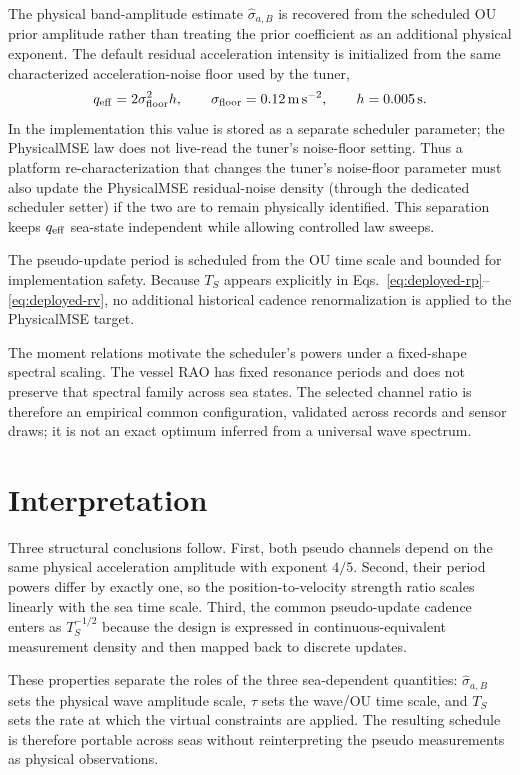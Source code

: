 \documentclass[conference]{IEEEtran}
\begin{document}
The physical band-amplitude estimate $\widehat\sigma_{a,B}$ is recovered from
the scheduled OU prior amplitude rather than treating the prior coefficient as
an additional physical exponent. The default residual acceleration intensity is
initialized from the same characterized acceleration-noise floor used by the
tuner,
\begin{equation}
 q_{\rm eff}=2\sigma_{\rm floor}^2h,
 \qquad
 \sigma_{\rm floor}=\SI{0.12}{m.s^{-2}},
 \qquad
 h=\SI{0.005}{s}.
 \label{eq:deployed-qeff}
\end{equation}
In the implementation this value is stored as a separate scheduler parameter;
the PhysicalMSE law does not live-read the tuner's noise-floor setting.  Thus a
platform re-characterization that changes the tuner's noise-floor parameter
must also update the PhysicalMSE residual-noise density (through the dedicated
scheduler setter) if the two are to remain physically identified.  This
separation keeps $q_{\rm eff}$ sea-state independent while allowing controlled
law sweeps.

The pseudo-update period is scheduled from the OU time scale and bounded for
implementation safety. Because $T_S$ appears explicitly in
Eqs.~\eqref{eq:deployed-rp}--\eqref{eq:deployed-rv}, no additional historical
cadence renormalization is applied to the PhysicalMSE target.

The moment relations motivate the scheduler's powers under a fixed-shape
spectral scaling. The vessel RAO has fixed resonance periods and does not
preserve that spectral family across sea states. The selected channel ratio
is therefore an empirical common configuration, validated across records and
sensor draws; it is not an exact optimum inferred from a universal wave spectrum.

\section{Interpretation}

Three structural conclusions follow. First, both pseudo channels depend on the
same physical acceleration amplitude with exponent $4/5$. Second, their period
powers differ by exactly one, so the position-to-velocity strength ratio scales
linearly with the sea time scale. Third, the common pseudo-update cadence enters
as $T_S^{-1/2}$ because the design is expressed in continuous-equivalent
measurement density and then mapped back to discrete updates.

These properties separate the roles of the three sea-dependent quantities:
$\widehat\sigma_{a,B}$ sets the physical wave amplitude scale, $\tau$ sets the
wave/OU time scale, and $T_S$ sets the rate at which the virtual constraints are
applied. The resulting schedule is therefore portable across seas without
reinterpreting the pseudo measurements as physical observations.
\end{document}
